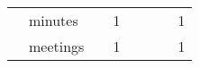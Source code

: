 \begin{table}[]
\begin{tabular}{clcccccc}
                     & minutes              &                                                                                         & 1                                                                      &                                                                   &                 &                & 1                  \\
                     & meetings             &                                                                                         & 1                                                                      &                                                                   &                 &                & 1                  \\ \hline
\end{tabular}
\end{table}







